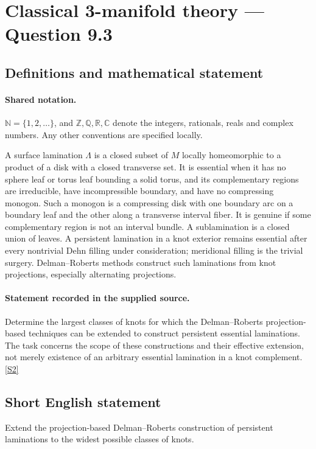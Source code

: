 \documentclass[11pt]{article}
\newcommand{\sref}[2]{\hyperlink{source:#1:#2}{[S#2]}}
\begin{document}
\section{Classical 3-manifold theory — Question 9.3}\label{statement}

\subsection{Definitions and mathematical statement}

\paragraph{Shared notation.}$\mathbb N=\{1,2,\ldots\}$, and $\mathbb Z,\mathbb Q,\mathbb R,\mathbb C$ denote the integers, rationals, reals and complex numbers. Any other conventions are specified locally.


A surface lamination $\Lambda$ is a closed subset of $M$ locally homeomorphic to a product of a disk with a closed transverse set. It is essential when it has no sphere leaf or torus leaf bounding a solid torus, and its complementary regions are irreducible, have incompressible boundary, and have no compressing monogon. Such a monogon is a compressing disk with one boundary arc on a boundary leaf and the other along a transverse interval fiber. It is genuine if some complementary region is not an interval bundle. A sublamination is a closed union of leaves. A persistent lamination in a knot exterior remains essential after every nontrivial Dehn filling under consideration; meridional filling is the trivial surgery. Delman--Roberts methods construct such laminations from knot projections, especially alternating projections.
\paragraph{Statement recorded in the supplied source.}
Determine the largest classes of knots for which the Delman--Roberts projection-based techniques can be extended to construct persistent essential laminations. The task concerns the scope of these constructions and their effective extension, not merely existence of an arbitrary essential lamination in a knot complement. \sref{statement}{2}
\subsection{Short English statement}
Extend the projection-based Delman--Roberts construction of persistent laminations to the widest possible classes of knots.
\end{document}
